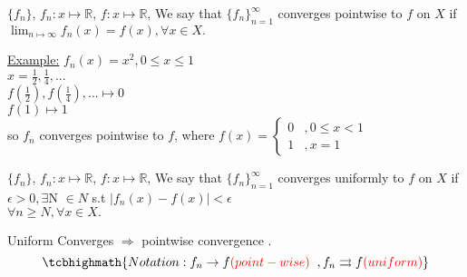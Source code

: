 \documentclass[12pt]{article}
\begin{document}
\begin{tcolorbox}[colback=blue!5!white,colframe=blue!75!black,title=Definition:]
   $\{f_n\}$, $f_n:x\longmapsto\mathbb{R}$, $f:x\longmapsto\mathbb{R}$, We say that $\{f_n\}_{n=1}^\infty$ converges pointwise to $f$ on $X$ if $\lim_{n\mapsto\infty}f_n(x)=f(x),\forall x\in X.$
\end{tcolorbox}

{\color{blue}\underline {Example:}} $f_n (x)=x^2, 0\leq x\leq 1$\\
$x=\frac{1}{2},\frac{1}{4},...$\\
$f(\frac{1}{2}),f(\frac{1}{4}),...\mapsto 0$\\
$f(1)\mapsto 1$\\
so $f_n$ converges pointwise to $f$, where 
$f(x)=\begin{cases} 
      0 &,0\leq x< 1\\
      1 &,x=1
\end{cases}$



\begin{tcolorbox}[colback=blue!5!white,colframe=blue!75!black,title=Definition:]
   $\{f_n\}$, $f_n:x\longmapsto\mathbb{R}$, $f:x\longmapsto\mathbb{R}$, We say that $\{f_n\}_{n=1}^\infty$ converges uniformly to $f$ on $X$ if $\epsilon >0 , \exists $N $\in N$ s.t $|f_n(x) - f(x) |< \epsilon $\\ $ \forall n \geq N ,  \forall x \in X.$  
\end{tcolorbox}

\begin{tcolorbox}[colback=blue!5!white,colframe=blue!75!black,title=Theorem ]
     Uniform Converges $\Rightarrow$ pointwise convergence . 
  $$\tcbhighmath{Notation : 
      f_n \rightarrow f {\color{red}{(point-wise)}} \hspace{2mm}
  ,  f_n \rightrightarrows  f
     {\color{red}{(uniform)}}}$$
\end{tcolorbox}
\end{document}
